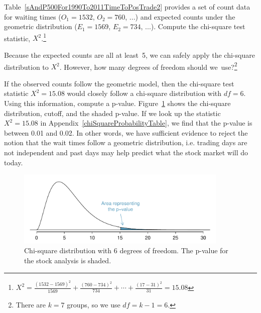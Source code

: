\begin{exercise}
Table~\ref{sAndP500For1990To2011TimeToPosTrade2} provides a set of count data for waiting times ($O_1=1532$, $O_2=760$, ...) and expected counts under the geometric distribution ($E_1=1569$, $E_2=734$, ...). Compute the chi-square test statistic, $X^2$.\footnote{$X^2=\frac{(1532-1569)^2}{1569} + \frac{(760-734)^2}{734} + \cdots + \frac{(17-31)^2}{31} = 15.08$}
\end{exercise}

\begin{exercise}
Because the expected counts are all at least~5, we can safely apply the chi-square distribution to $X^2$. However, how many degrees of freedom should we~use?\footnote{There are $k=7$ groups, so we use $df=k-1=6$.}
\end{exercise}

\begin{example}{If the observed counts follow the geometric model, then the chi-square test statistic $X^2=15.08$ would closely follow a chi-square distribution with $df=6$. Using this information, compute a p-value.} \label{RejectGeomModelForSP500StockDataFor1990To2011}
Figure~\ref{geomFitPValueForSP500For1990To2011} shows the chi-square distribution, cutoff, and the shaded p-value. If we look up the statistic $X^2=15.08$ in Appendix~\ref{chiSquareProbabilityTable}, we find that the p-value is between 0.01 and 0.02. In other words, we have sufficient evidence to reject the notion that the wait times follow a geometric distribution, i.e. trading days are not independent and past days may help predict what the stock market will do today.
\end{example}

\begin{figure}
\centering
\includegraphics[width=0.9\textwidth]{ch_inference_for_props/figures/geomFitPValueForSP500For1990To2011/geomFitPValueForSP500For1990To2011}
\caption{Chi-square distribution with 6 degrees of freedom. The p-value for the stock analysis is shaded.}
\label{geomFitPValueForSP500For1990To2011}
\end{figure}

